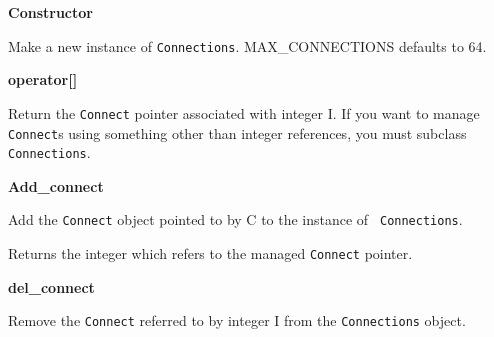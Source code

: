 \begin{description}

\item {\bf Constructor}


Make a new instance of {\tt Connections}. MAX\_CONNECTIONS defaults to 64.

\item {\bf operator[]}


Return the {\tt Connect} pointer associated with integer I. If you want to
manage {\tt Connect}s using something other than integer references, you must
subclass {\tt Connections}.

\item {\bf Add\_connect}


Add the {\tt Connect} object pointed to by C to the instance of {\tt
Connections}.

Returns the integer which refers to the managed {\tt Connect} pointer.

\item {\bf del\_connect}


Remove the {\tt Connect} referred to by integer I from the
{\tt Connections}  object. 

\end{description}


